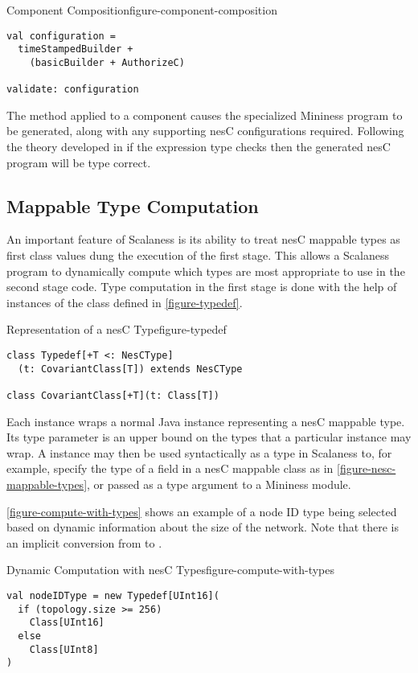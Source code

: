 \begin{fpfig}[tbhp]{Component Composition}{figure-component-composition}
{
\begin{Verbatim}[fontsize=\small]
val configuration =
  timeStampedBuilder +
    (basicBuilder + AuthorizeC)

validate: configuration
\end{Verbatim}
}
\end{fpfig}

The  method applied to a component causes the
specialized Mininess program to be generated, along with any
supporting nesC configurations required. Following the theory
developed in \cite{FramedML} if the  expression type
checks then the generated nesC program will be type correct.

\subsection{Mappable Type Computation}
\label{section-first-class-types}

An important feature of Scalaness is its ability to treat nesC
mappable types as first class values dung the execution of the first
stage. This allows a Scalaness program to dynamically compute which
types are most appropriate to use in the second stage code. Type
computation in the first stage is done with the help of instances of
the  class defined in \autoref{figure-typedef}.

\begin{fpfig}[tbhp]{Representation of a nesC Type}{figure-typedef}
{
\begin{Verbatim}[fontsize=\small]
class Typedef[+T <: NesCType]
  (t: CovariantClass[T]) extends NesCType

class CovariantClass[+T](t: Class[T])
\end{Verbatim}
}
\end{fpfig}

Each  instance wraps a normal Java  instance
representing a nesC mappable type. Its type parameter is an upper
bound on the types that a particular instance may wrap. A
 instance may then be used syntactically as a type in
Scalaness to, for example, specify the type of a field in a nesC
mappable class as in \autoref{figure-nesc-mappable-types}, or passed
as a type argument to a Mininess module.

\autoref{figure-compute-with-types} shows an example of a node ID type
being selected based on dynamic information about the size of the
network. Note that there is an implicit conversion from 
to .

\begin{fpfig}[tbhp]{Dynamic Computation with nesC Types}{figure-compute-with-types}
{
\begin{Verbatim}[fontsize=\small]
val nodeIDType = new Typedef[UInt16](
  if (topology.size >= 256)
    Class[UInt16]
  else
    Class[UInt8]
)
\end{Verbatim}
}
\end{fpfig}
